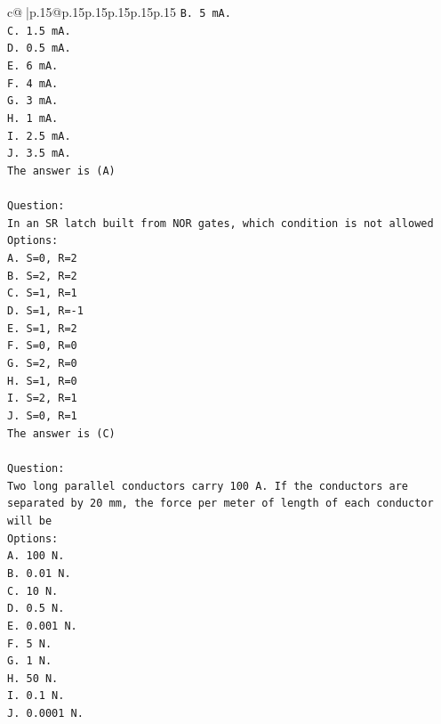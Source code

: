 \documentclass{article}
\begin{document}
{\begin{supertabular}{c@{$\;$}|p{.15\linewidth}@{}p{.15\linewidth}p{.15\linewidth}p{.15\linewidth}p{.15\linewidth}p{.15\linewidth}}
{{{\texttt{B. 5 mA.} \\
\texttt{C. 1.5 mA.} \\
\texttt{D. 0.5 mA.} \\
\texttt{E. 6 mA.} \\
\texttt{F. 4 mA.} \\
\texttt{G. 3 mA.} \\
\texttt{H. 1 mA.} \\
\texttt{I. 2.5 mA.} \\
\texttt{J. 3.5 mA.} \\
\texttt{The answer is (A)} \\
\\ 
\texttt{Question:} \\
\texttt{In an SR latch built from NOR gates, which condition is not allowed} \\
\texttt{Options:} \\
\texttt{A. S=0, R=2} \\
\texttt{B. S=2, R=2} \\
\texttt{C. S=1, R=1} \\
\texttt{D. S=1, R={-}1} \\
\texttt{E. S=1, R=2} \\
\texttt{F. S=0, R=0} \\
\texttt{G. S=2, R=0} \\
\texttt{H. S=1, R=0} \\
\texttt{I. S=2, R=1} \\
\texttt{J. S=0, R=1} \\
\texttt{The answer is (C)} \\
\\ 
\texttt{Question:} \\
\texttt{Two long parallel conductors carry 100 A. If the conductors are separated by 20 mm, the force per meter of length of each conductor will be} \\
\texttt{Options:} \\
\texttt{A. 100 N.} \\
\texttt{B. 0.01 N.} \\
\texttt{C. 10 N.} \\
\texttt{D. 0.5 N.} \\
\texttt{E. 0.001 N.} \\
\texttt{F. 5 N.} \\
\texttt{G. 1 N.} \\
\texttt{H. 50 N.} \\
\texttt{I. 0.1 N.} \\
\texttt{J. 0.0001 N.} \\
}}}
\end{supertabular}}
\end{document}
